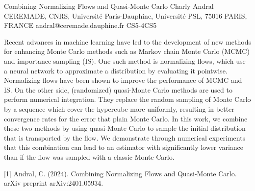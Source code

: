 \begin{talk}
\end{talk}

\begin{talk}
  {Combining Normalizing Flows and Quasi-Monte Carlo}%
  {Charly Andral}%
  { CEREMADE, CNRS, Université Paris-Dauphine, Université PSL, 75016 PARIS, FRANCE}%
  {andral@ceremade.dauphine.fr}%
  {}%
{}{}{CS5-4}{CS5}


				
				

    Recent advances in machine learning have led to the development of new methods for enhancing Monte Carlo methods such as Markov chain Monte Carlo (MCMC) and importance sampling (IS). One such method is normalizing flows, which use a neural network to approximate a distribution by evaluating it pointwise. Normalizing flows have been shown to improve the performance of MCMC and IS. On the other side, (randomized) quasi-Monte Carlo methods are used to perform numerical integration. They replace the random sampling of Monte Carlo by a sequence which cover the hypercube more uniformly, resulting in better convergence rates for the error that plain Monte Carlo. In this work, we combine these two methods by using quasi-Monte Carlo to sample the initial distribution that is transported by the flow. We demonstrate through numerical experiments that this combination can lead to an estimator with significantly lower variance than if the flow was sampled with a classic Monte Carlo.

\medskip

[1] Andral, C. (2024). Combining Normalizing Flows and Quasi-Monte Carlo. arXiv preprint arXiv:2401.05934.
\end{talk}

